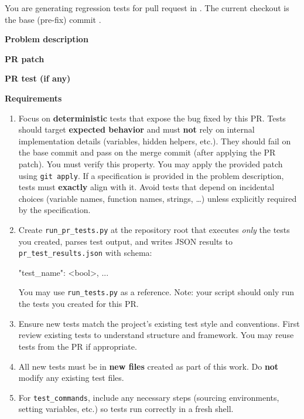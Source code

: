 \begin{promptbox}
You are generating regression tests for pull request  in . The current checkout is the base (pre-fix) commit .

\medskip
\textbf{Problem description}\\

\medskip
\textbf{PR patch}\\

\medskip
\textbf{PR test (if any)}\\

\medskip
\textbf{Requirements}
\begin{enumerate}[leftmargin=1.6em, itemsep=0.35em]
  \item Focus on \textbf{deterministic} tests that expose the bug fixed by this PR. Tests should target \textbf{expected behavior} and must \textbf{not} rely on internal implementation details (variables, hidden helpers, etc.). They should fail on the base commit and pass on the merge commit (after applying the PR patch). You must verify this property. You may apply the provided patch using \texttt{git apply}. If a specification is provided in the problem description, tests must \textbf{exactly} align with it. Avoid tests that depend on incidental choices (variable names, function names, strings, \dots) unless explicitly required by the specification.
  \item Create \texttt{run\_pr\_tests.py} at the repository root that executes \emph{only} the tests you created, parses test output, and writes JSON results to \texttt{pr\_test\_results.json} with schema:
  \begin{schemabox}
{"test_name": <bool>, ...}
  \end{schemabox}
  You may use \texttt{run\_tests.py} as a reference. Note: your script should only run the tests you created for this PR.
  \item Ensure new tests match the project's existing test style and conventions. First review existing tests to understand structure and framework. You may reuse tests from the PR if appropriate.
  \item All new tests must be in \textbf{new files} created as part of this work. Do \textbf{not} modify any existing test files.
  \item For \texttt{test\_commands}, include any necessary steps (sourcing environments, setting variables, etc.) so tests run correctly in a fresh shell.
\end{enumerate}


\end{promptbox}

